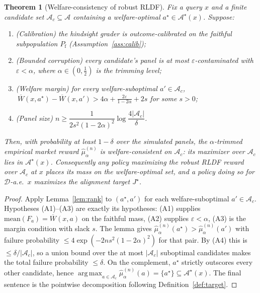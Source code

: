 \documentclass[11pt]{article}
\theoremstyle{plain}
\newtheorem{theorem}{Theorem}
\theoremstyle{definition}
\theoremstyle{remark}
\newcommand{\Ac}{\mathcal{A}}
\newcommand{\Dc}{\mathcal{D}}
\newcommand{\Wbar}{\overline{W}}
\newcommand{\eps}{\varepsilon}
\DeclareMathOperator*{\argmax}{arg\,max}
\begin{document}
\begin{theorem}[Welfare-consistency of robust RLDF]
\label{thm:main}
Fix a query $x$ and a finite candidate set $\Ac_c\subseteq\Ac$ containing a welfare-optimal
$a^\star\in\Ac^\star(x)$. Suppose:
\begin{enumerate}[label=\textup{(A\arabic*)},leftmargin=3em,itemsep=2pt,topsep=2pt]
  \item \textup{(Calibration)} the hindsight grader is outcome-calibrated on the faithful
  subpopulation $P_{\mathrm f}$ (Assumption~\ref{ass:calib});
  \item \textup{(Bounded corruption)} every candidate's panel is at most $\eps$-contaminated
  with $\eps<\alpha$, where $\alpha\in(0,\tfrac12)$ is the trimming level;
  \item \textup{(Welfare margin)} for every welfare-suboptimal $a'\in\Ac_c$,
  $\ \Wbar(x,a^\star)-\Wbar(x,a')>4\alpha+\frac{2\eps}{1-2\alpha}+2s$ for some $s>0$;
  \item \textup{(Panel size)} $n\ge\dfrac{1}{2s^2(1-2\alpha)^2}\log\dfrac{4|\Ac_c|}{\delta}$.
\end{enumerate}
Then, with probability at least $1-\delta$ over the simulated panels, the $\alpha$-trimmed
empirical market reward $\hat\mu_\alpha^{(n)}$ is welfare-consistent on $\Ac_c$: its maximizer
over $\Ac_c$ lies in $\Ac^\star(x)$. Consequently any policy maximizing the robust RLDF reward
over $\Ac_c$ at $x$ places its mass on the welfare-optimal set, and a policy doing so for
$\Dc$-a.e.\ $x$ maximizes the alignment target $J^\star$.
\end{theorem}

\begin{proof}
Apply Lemma~\ref{lem:rank} to $(a^\star,a')$ for each welfare-suboptimal $a'\in\Ac_c$.
Hypotheses (A1)--(A3) are exactly its hypotheses: (A1) supplies
$\mathrm{mean}(F_a)=\Wbar(x,a)$ on the faithful mass, (A2) supplies $\eps<\alpha$, (A3) is the
margin condition with slack $s$. The lemma gives
$\hat\mu_\alpha^{(n)}(a^\star)>\hat\mu_\alpha^{(n)}(a')$ with failure probability
$\le4\exp(-2ns^2(1-2\alpha)^2)$ for that pair. By (A4) this is $\le\delta/|\Ac_c|$, so a union
bound over the at most $|\Ac_c|$ suboptimal candidates makes the total failure probability
$\le\delta$. On the complement, $a^\star$ strictly outscores every other candidate, hence
$\argmax_{a\in\Ac_c}\hat\mu_\alpha^{(n)}(a)=\{a^\star\}\subseteq\Ac^\star(x)$. The final
sentence is the pointwise decomposition following Definition~\ref{def:target}.
\end{proof}
\end{document}
